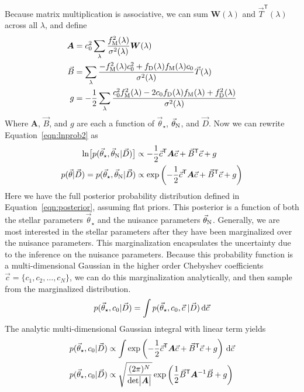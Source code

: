 \documentclass[preprint]{aastex} %
\newcommand{\vt}{\vec{\theta}}
\newcommand{\vstar}{\vt_{\star}}
\newcommand{\vN}{\vt_{\rm N}}
\newcommand{\vc}{\vec{c}}
\newcommand{\fM}{f_{\rm M}}
\newcommand{\fD}{f_{\rm D}}
\newcommand{\vD}{\vec{D}}
\newcommand{\dd}{\,{\rm d}}
\newcommand{\trans}{\mathsf{T}}
\begin{document}
Because matrix multiplication is associative, we can sum ${\bm W(\lambda)}$ and $\vec{T}^\trans(\lambda)$ across all $\lambda$, and define
\begin{align}
  {\bm A} &= c_0^2 \sum_{\lambda} \frac{\fM^2(\lambda)}{\sigma^2(\lambda)} {\bm W}(\lambda) \\
  \vec{B} &= \sum_{\lambda} \frac{-\fM^2(\lambda) c_0^2 + \fD(\lambda) \fM (\lambda) c_0}{\sigma^2(\lambda)} \vec{T}(\lambda)\\
  g &= -\frac{1}{2} \sum_{\lambda} \frac{c_0^2 \fM^2(\lambda) - 2 c_0 \fD(\lambda) \fM(\lambda) + \fD^2(\lambda)}{\sigma^2(\lambda)} 
\end{align}
Where ${\bm A}$, $\vec{B}$, and $g$ are each a function of $\vstar$, $\vN$, and $\vD$. Now we can rewrite Equation~\ref{eqn:lnprob2} as 
\begin{align}
  \ln \bigl [p(\vstar, \vN | \vD) \bigr] &\propto - \frac{1}{2} \vc^\trans {\bm A} \vc + \vec{B}^\trans \vc + g\\
  p(\vt | \vD) = p(\vstar, \vN | \vD) &\propto \exp \left ( - \frac{1}{2} \vc^\trans {\bm A} \vc + \vec{B}^\trans \vc + g \right )
  \label{eqn:lnprob_matrix}
\end{align}
Here we have the full posterior probability distribution defined in Equation~\ref{eqn:posterior}, assuming flat priors. This posterior is a function of both the stellar parameters $\vstar$ and the nuisance parameters $\vN$. Generally, we are most interested in the stellar parameters after they have been marginalized over the nuisance parameters. This marginalization encapsulates the uncertainty due to the inference on the nuisance parameters. Because this probability function is a multi-dimensional Gaussian in the higher order Chebyshev coefficients $\vc = \{c_1, c_2, \ldots, c_N \}$, we can do this marginalization analytically, and then sample from the marginalized distribution. 
\begin{equation}
  p(\vstar, c_0 | \vD) = \int p(\vstar, c_0, \vc\; | \vD) \dd \vc
\end{equation}
The analytic multi-dimensional Gaussian integral with linear term \citep{sgd+09} yields 
\begin{align}
  p(\vstar, c_0 | \vD) &\propto \int \exp \left ( - \frac{1}{2} \vc^\trans {\bm A} \vc + \vec{B}^\trans \vc + g \right ) \dd \vc\\
  p(\vstar, c_0 | \vD) &\propto \sqrt{\frac{(2 \pi )^N}{ {\rm det} \bigl |{\bm A} \bigr |}} \exp{ \left ( \frac{1}{2} \vec{B}^\trans {\bm A}^{-1} \vec{B} + g \right )}
\end{align}
\end{document}
